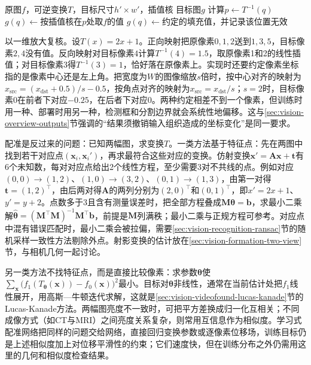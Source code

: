 \begin{algorithm}[基于反向映射的图像变换]
  \label{alg:vision-formation-inverse-mapping}
  \begin{algorithmic}[1]
    \Require 原图$f$，可逆变换$T$，目标尺寸$h'\times w'$，插值核
    \Ensure 目标图$g$
      \State 计算$p\gets T^{-1}(q)$
        \State $g(q)\gets$按插值核在$p$处取$f$的值
      \Else
        \State $g(q)\gets$约定的填充值，并记录该位置无效
      \EndIf
    \EndFor
  \end{algorithmic}
\end{algorithm}

以一维放大复核。设$T(x)=2x+1$。正向映射把原像素$0,1,2$送到$1,3,5$，目标像素$2,4$没有值。反向映射对目标像素$4$计算$T^{-1}(4)=1.5$，取原像素1和2的线性插值；对目标像素$3$得$T^{-1}(3)=1$，恰好落在原像素上。实现时还要约定像素坐标指的是像素中心还是左上角。把宽度为$W$的图像缩放$s$倍时，按中心对齐的映射为$x_{\mathrm{src}}=(x_{\mathrm{dst}}+0.5)/s-0.5$，按角点对齐的映射为$x_{\mathrm{src}}=x_{\mathrm{dst}}/s$；$s=2$时，目标像素0在前者下对应$-0.25$，在后者下对应$0$。两种约定相差不到一个像素，但训练时用一种、部署时用另一种，检测框和分割边界就会系统性地偏移。这与\ref{sec:vision-overview-outputs}节强调的“结果须撤销输入组织造成的坐标变化”是同一要求。

配准是反过来的问题：已知两幅图，求变换$T$。一类方法基于特征点：先在两图中找到若干对应点$(\bm x_i,\bm x_i')$，再求最符合这些对应的变换。仿射变换$\bm x'=\bm A\bm x+\bm t$有6个未知数，每对对应点给出2个线性方程，至少需要3对不共线的点。例如对应$(0,0)\to(1,2)$、$(1,0)\to(3,2)$、$(0,1)\to(1,3)$，由第一对得$\bm t=(1,2)^\top$，由后两对得$\bm A$的两列分别为$(2,0)^\top$和$(0,1)^\top$，即$x'=2x+1$、$y'=y+2$。点数多于3且含有测量误差时，把全部方程叠成$\bm M\bm\theta=\bm b$，求最小二乘解$\hat{\bm\theta}=(\bm M^\top\bm M)^{-1}\bm M^\top\bm b$，前提是$\bm M$列满秩；最小二乘与正规方程可参考。对应点中混有错误匹配时，最小二乘会被拉偏，需要\ref{sec:vision-recognition-ransac}节的随机采样一致性方法剔除外点。射影变换的估计放在\ref{sec:vision-formation-two-view}节，与相机几何一起讨论。

另一类方法不找特征点，而是直接比较像素：求参数$\bm\theta$使$\sum_{\bm x}\bigl(f_1(T_{\bm\theta}(\bm x))-f_0(\bm x)\bigr)^2$最小。目标对$\bm\theta$非线性，通常在当前估计处把$f_1$线性展开，用高斯—牛顿迭代求解，这就是\ref{sec:vision-videofound-lucas-kanade}节的Lucas-Kanade方法。两幅图亮度不一致时，可把平方差换成归一化互相关；不同成像方式（如CT与MRI）之间亮度关系复杂，则常用互信息作为相似度。学习式配准网络把同样的问题交给网络，直接回归变换参数或逐像素位移场，训练目标仍是上述相似度加上对位移平滑性的约束；它们速度快，但在训练分布之外仍需用这里的几何和相似度检查结果。

